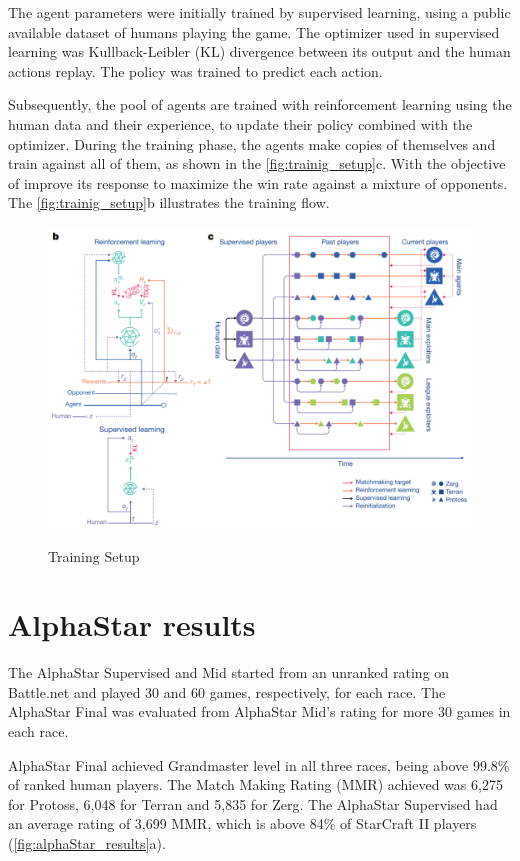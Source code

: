\documentclass[
    article, 
    12pt,				%
	oneside,			%
	a4paper,			%
	chapter=TITLE,		%
	section=TITLE,		%
	english,			%
	english,				%
	sumario=tradicional
]{abntex2}
\begin{document}
The agent parameters were initially trained by supervised learning, using a public available dataset of humans playing the game. 
The optimizer used in supervised learning was Kullback-Leibler (KL) divergence between its output and the human actions replay.
The policy was trained to predict each action.

Subsequently, the pool of agents are trained with reinforcement learning using the human data and their experience, to update their policy combined with the optimizer. 
During the training phase, the agents make copies of themselves and train against all of them, as shown in the \autoref{fig:trainig_setup}c. 
With the objective of improve its response to maximize the win rate against a mixture of opponents.
The \autoref{fig:trainig_setup}b illustrates the training flow. 


\begin{figure}[ht]
    \centering
    \caption{Training Setup}
    \includegraphics[width=\textwidth]{images/training.png}
    \label{fig:trainig_setup}
\end{figure}


\section{AlphaStar results}

The AlphaStar Supervised and Mid started from an unranked rating on Battle.net and played 30 and 60 games, respectively, for each race.
The AlphaStar Final was evaluated from AlphaStar Mid's rating for more 30 games in each race.

AlphaStar Final achieved Grandmaster level in all three races, being above 99.8\% of ranked human players.
The Match Making Rating (MMR) achieved was 6,275 for Protoss, 6,048 for Terran and 5,835 for Zerg.
The AlphaStar Supervised had an average rating of 3,699 MMR, which is above 84\% of StarCraft II players (\autoref{fig:alphaStar_results}a).
\end{document}
